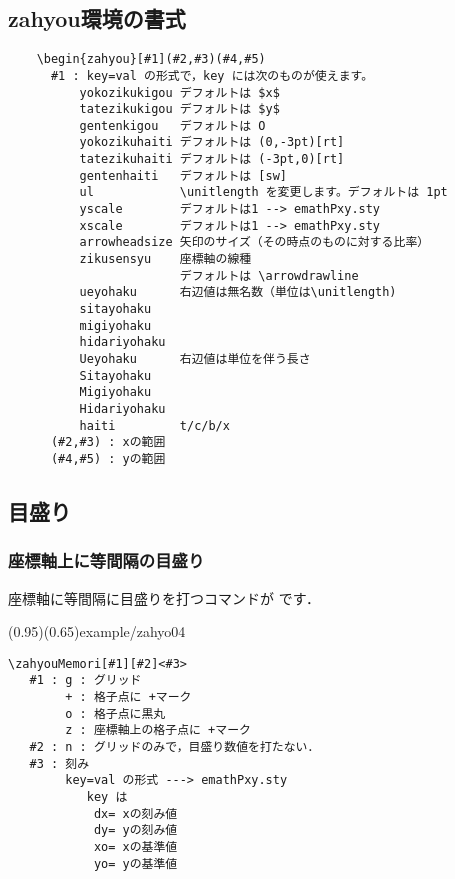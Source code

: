 \subsection{\textsf{zahyou}環境の書式}
\begin{boxnote}
\begin{verbatim}
    \begin{zahyou}[#1](#2,#3)(#4,#5)
      #1 : key=val の形式で，key には次のものが使えます。
          yokozikukigou デフォルトは $x$
          tatezikukigou デフォルトは $y$
          gentenkigou   デフォルトは O
          yokozikuhaiti デフォルトは (0,-3pt)[rt]
          tatezikuhaiti デフォルトは (-3pt,0)[rt]
          gentenhaiti   デフォルトは [sw]
          ul            \unitlength を変更します。デフォルトは 1pt
          yscale        デフォルトは1 --> emathPxy.sty
          xscale        デフォルトは1 --> emathPxy.sty
          arrowheadsize 矢印のサイズ（その時点のものに対する比率）
          zikusensyu    座標軸の線種
                        デフォルトは \arrowdrawline
          ueyohaku      右辺値は無名数（単位は\unitlength)
          sitayohaku
          migiyohaku
          hidariyohaku
          Ueyohaku      右辺値は単位を伴う長さ
          Sitayohaku
          Migiyohaku
          Hidariyohaku
          haiti         t/c/b/x
      (#2,#3) : xの範囲
      (#4,#5) : yの範囲
\end{verbatim}
\end{boxnote}

\subsection{目盛り}
\subsubsection{座標軸上に等間隔の目盛り}
座標軸に等間隔に目盛りを打つコマンドが  です．

\showexample[座標目盛り](0.95)(0.65){example/zahyo04}

\begin{boxnote}
\begin{verbatim}
\zahyouMemori[#1][#2]<#3>
   #1 : g : グリッド
        + : 格子点に +マーク
        o : 格子点に黒丸
        z : 座標軸上の格子点に +マーク
   #2 : n : グリッドのみで，目盛り数値を打たない．
   #3 : 刻み
        key=val の形式 ---> emathPxy.sty
           key は
            dx= xの刻み値
            dy= yの刻み値
            xo= xの基準値
            yo= yの基準値
\end{verbatim}
\end{boxnote}

